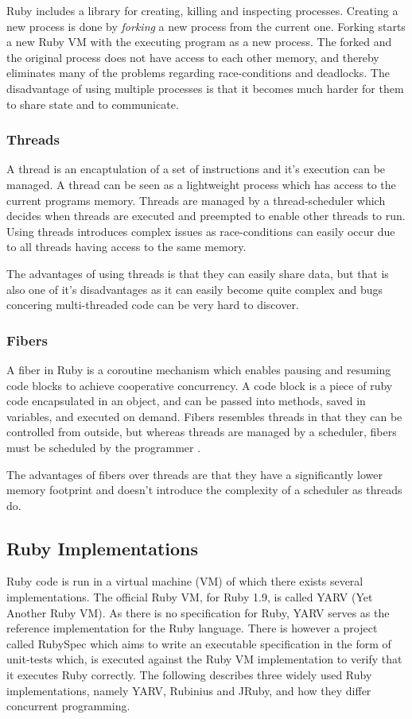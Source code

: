Ruby includes a library for creating, killing and inspecting
processes. Creating a new process is done by \textit{forking} a new process
from the current one. Forking starts a new Ruby VM with the executing program
as a new process. The forked and the original process does not have access to
each other memory, and thereby eliminates many of the problems regarding
race-conditions and deadlocks. The disadvantage of using multiple processes is
that it becomes much harder for them to share state and to communicate.

\subsubsection{Threads}
A thread is an encaptulation of a set of instructions and it's execution can
be managed. A thread can be seen as a lightweight process which has access to
the current programs memory. Threads are managed by a thread-scheduler which
decides when threads are executed and preempted to enable other threads to
run. Using threads introduces complex issues as race-conditions can easily
occur due to all threads having access to the same memory.

The advantages of using threads is that they can easily share data, but that
is also one of it's disadvantages as it can easily become quite complex and
bugs concering multi-threaded code can be very hard to discover.

\subsubsection{Fibers}
A fiber in Ruby is a coroutine mechanism which enables pausing and resuming
code blocks to achieve cooperative concurrency. A code block is a
piece of ruby code encapsulated in an object, and can be passed into
methods, saved in variables, and executed on demand. Fibers resembles threads in
that they can be controlled from outside, but whereas threads are managed by a
scheduler, fibers must be scheduled by the programmer \cite{rubyfiber}.

The advantages of fibers over threads are that they have a significantly lower
memory footprint and doesn't introduce the complexity of a scheduler as
threads do.

\subsection{Ruby Implementations}
Ruby code is run in a virtual machine (VM) of which there exists several
implementations. The official Ruby VM, for Ruby 1.9, is called YARV (Yet 
Another Ruby VM). As there is no specification for Ruby, YARV serves as
the reference implementation for the Ruby language.  There is however a
project called RubySpec which aims to write an executable specification in the
form of unit-tests which, is executed against the Ruby VM implementation to
verify that it executes Ruby correctly. The following describes three widely
used Ruby implementations, namely YARV, Rubinius and JRuby, and how they
differ concurrent programming.

